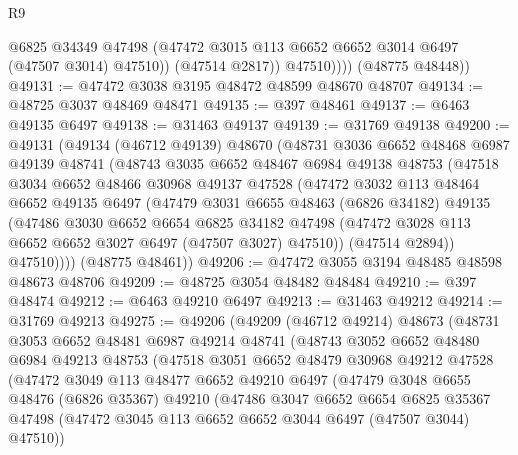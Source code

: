 \begin{lexlean}{R9}
\begin{coremodule}
                  @6825
                  @34349
                  @47498
                  (@47472 @3015 @113 @6652 @6652 @3014 @6497 (@47507 @3014) @47510))
                (@47514 @2817))
              @47510))))
      (@48775 @48448))
@49131 := @47472 @3038 @3195 @48472 @48599 @48670 @48707
@49134 := @48725 @3037 @48469 @48471
@49135 := @397 @48461
@49137 := @6463 @49135 @6497
@49138 := @31463 @49137
@49139 := @31769 @49138
@49200 := @49131
    (@49134
      (@46712 @49139)
      @48670
      (@48731
        @3036
        @6652
        @48468
        @6987
        @49139
        @48741
        (@48743
          @3035
          @6652
          @48467
          @6984
          @49138
          @48753
          (@47518
            @3034
            @6652
            @48466
            @30968
            @49137
            @47528
            (@47472
              @3032
              @113
              @48464
              @6652
              @49135
              @6497
              (@47479
                @3031
                @6655
                @48463
                (@6826 @34182)
                @49135
                (@47486
                  @3030
                  @6652
                  @6654
                  @6825
                  @34182
                  @47498
                  (@47472 @3028 @113 @6652 @6652 @3027 @6497 (@47507 @3027) @47510))
                (@47514 @2894))
              @47510))))
      (@48775 @48461))
@49206 := @47472 @3055 @3194 @48485 @48598 @48673 @48706
@49209 := @48725 @3054 @48482 @48484
@49210 := @397 @48474
@49212 := @6463 @49210 @6497
@49213 := @31463 @49212
@49214 := @31769 @49213
@49275 := @49206
    (@49209
      (@46712 @49214)
      @48673
      (@48731
        @3053
        @6652
        @48481
        @6987
        @49214
        @48741
        (@48743
          @3052
          @6652
          @48480
          @6984
          @49213
          @48753
          (@47518
            @3051
            @6652
            @48479
            @30968
            @49212
            @47528
            (@47472
              @3049
              @113
              @48477
              @6652
              @49210
              @6497
              (@47479
                @3048
                @6655
                @48476
                (@6826 @35367)
                @49210
                (@47486
                  @3047
                  @6652
                  @6654
                  @6825
                  @35367
                  @47498
                  (@47472 @3045 @113 @6652 @6652 @3044 @6497 (@47507 @3044) @47510))

\end{coremodule}
\end{lexlean}
